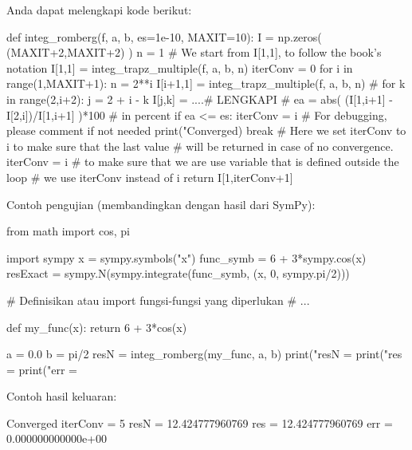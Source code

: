 Anda dapat melengkapi kode berikut:
\begin{pythoncode}
def integ_romberg(f, a, b, es=1e-10, MAXIT=10):
    I = np.zeros( (MAXIT+2,MAXIT+2) )
    n = 1
    # We start from I[1,1], to follow the book's notation
    I[1,1] = integ_trapz_multiple(f, a, b, n)
    iterConv = 0
    for i in range(1,MAXIT+1):
        n = 2**i
        I[i+1,1] = integ_trapz_multiple(f, a, b, n)
        #
        for k in range(2,i+2):
            j = 2 + i - k
            I[j,k] = ....# LENGKAPI
        #
        ea = abs( (I[1,i+1] - I[2,i])/I[1,i+1] )*100 # in percent
        if ea <= es:
            iterConv = i
            # For debugging, please comment if not needed
            print("Converged)
            break
        # Here we set iterConv to i to make sure that the last value
        # will be returned in case of no convergence.
        iterConv = i
    # to make sure that we are use variable that is defined outside the loop
    # we use iterConv instead of i
    return I[1,iterConv+1]
\end{pythoncode}

Contoh pengujian (membandingkan dengan hasil dari SymPy):
\begin{pythoncode}
from math import cos, pi

import sympy
x = sympy.symbols("x")
func_symb = 6 + 3*sympy.cos(x)
resExact = sympy.N(sympy.integrate(func_symb, (x, 0, sympy.pi/2)))

# Definisikan atau import fungsi-fungsi yang diperlukan
# ...
    
def my_func(x):
    return 6 + 3*cos(x)
    
a = 0.0
b = pi/2
resN = integ_romberg(my_func, a, b)
print("resN = %
print("res  = %
print("err  = %
\end{pythoncode}

Contoh hasil keluaran:
\begin{textcode}
Converged
iterConv =  5
resN =    12.424777960769
res  =    12.424777960769
err  = 0.000000000000e+00    
\end{textcode}

